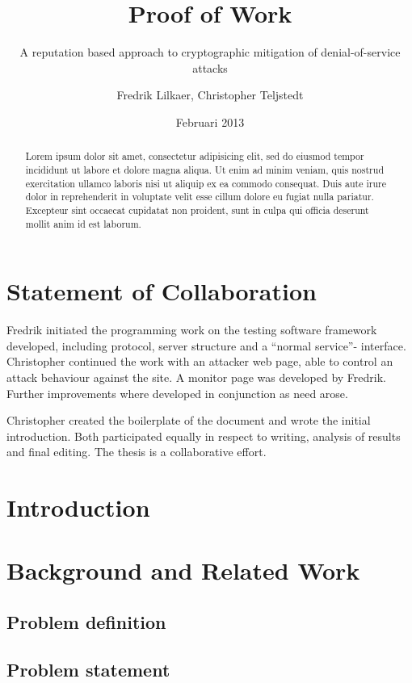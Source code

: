\documentclass[a4paper,11pt]{kth-mag}
\title{Proof of Work}
\subtitle{A reputation based approach to cryptographic mitigation of denial-of-service attacks}
\author{Fredrik Lilkaer, Christopher Teljstedt}
\date{Februari 2013}
\begin{document}
\removepagenumbers
\maketitle
{}
\newpage
\begin{abstract}
Lorem ipsum dolor sit amet, consectetur adipisicing elit, sed do eiusmod tempor incididunt ut labore et dolore magna aliqua. Ut enim ad minim veniam, quis nostrud exercitation ullamco laboris nisi ut aliquip ex ea commodo consequat. Duis aute irure dolor in reprehenderit in voluptate velit esse cillum dolore eu fugiat nulla pariatur. Excepteur sint occaecat cupidatat non proident, sunt in culpa qui officia deserunt mollit anim id est laborum.
\end{abstract}
\newpage
\section*{Statement of Collaboration}
Fredrik initiated the programming work on the testing software framework developed, including protocol, server structure and a ``normal service''- interface.
Christopher continued the work with an attacker web page, able to control an attack behaviour against the site. A monitor page was developed by Fredrik. Further improvements where developed in conjunction as need arose.

Christopher created the boilerplate of the document and wrote the initial introduction.
Both participated equally in respect to writing, analysis of results and final editing. The thesis is a collaborative effort.
\newpage  
\setcounter{section}{0}
\tableofcontents
\newpage
\section{Introduction}

\section*{Background and Related Work}

\subsection*{Problem definition}

\subsection*{Problem statement} %

\end{document}
